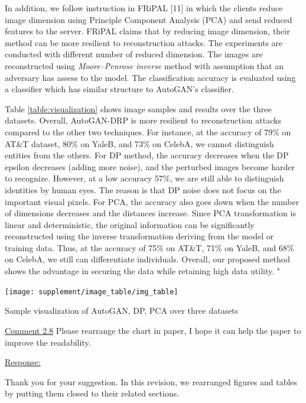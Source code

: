 \documentclass[]{elsarticle}
\begin{document}
	In addition, we follow instruction in FRiPAL [11] in which the clients reduce image dimension using Principle Component Analysis (PCA) and send reduced features to the server. FRiPAL claims that by reducing image dimension, their method can be more resilient to reconstruction attacks. The experiments are conducted with different number of reduced dimension. The images are reconstructed using \textit{Moore–Penrose inverse} method with assumption that an adversary has assess to the model. The classification accuracy is evaluated using a classifier which has similar structure to AutoGAN's classifier.  
	
	Table \ref{table:visualization} shows image samples and results over the three datasets. Overall, AutoGAN-DRP is more resilient to reconstruction attacks compared to the other two techniques. For instance, at the accuracy of 79\% on AT\&T dataset, 80\% on YaleB, and 73\% on CelebA, we cannot distinguish entities from the others. For DP method, the accuracy decreases when the DP epsilon decreases (adding more noise), and the perturbed images become harder to recognize. However, at a low accuracy 57\%, we are still able to distinguish identities by human eyes. The reason is that DP noise does not focus on the important visual pixels. For PCA, the accuracy also goes down when the number of dimensions decreases and the distances increase. Since PCA transformation is linear and deterministic, the original information can be significantly reconstructed using the inverse transformation deriving from the model or training data. Thus, at the accuracy of 75\% on AT\&T, 71\% on YaleB, and 68\% on CelebA, we still can differentiate individuals. Overall, our proposed method shows the advantage in securing the data while retaining high data utility.  "
	\\ 
	\setcounter{table}{1}
	\begin{table}[H]
		\centering
		\texttt{[image: supplement/image\_table/img\_table]}
		\caption{Sample visualization of AutoGAN, DP, PCA over three datasets}
		\label{table:visualization}
	\end{table}  



\color{blue}
\underline{Comment 2.8}
Please rearrange the chart in paper, I hope it can help the paper to improve the readability. 
	
\color{black}
\underline{Response:}

Thank you for your suggestion. In this revision, we rearranged figures and tables by putting them closed to their related sections.\\
\end{document}
